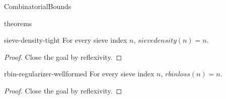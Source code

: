 \begin{lexlean}{CombinatorialBounds}
\begin{section}{theorems}
  \begin{theorem}{sieve-density-tight}
  \noaxioms
  For every sieve index \(n\), \(sievedensity(n) = n\).
  \begin{proof}
  Close the goal by reflexivity.
  \end{proof}
  \end{theorem}

  \begin{theorem}{rbin-regularizer-wellformed}
  \noaxioms
  For every sieve index \(n\), \(rbinloss(n) = n\).
  \begin{proof}
  Close the goal by reflexivity.
  \end{proof}
  \end{theorem}
\end{section}
\end{lexlean}
